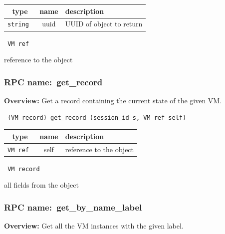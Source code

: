  
\vspace{0.3cm}
\begin{tabular}{|c|c|p{7cm}|}
 \hline
{\bf type} & {\bf name} & {\bf description} \\ \hline
{\tt string } & uuid & UUID of object to return \\ \hline 

\end{tabular}

\vspace{0.3cm}

{\tt 
VM ref
}


reference to the object
\vspace{0.3cm}
\vspace{0.3cm}
\vspace{0.3cm}
\subsubsection{RPC name:~get\_record}

{\bf Overview:} 
Get a record containing the current state of the given VM.

\begin{verbatim} (VM record) get_record (session_id s, VM ref self)\end{verbatim}



 
\vspace{0.3cm}
\begin{tabular}{|c|c|p{7cm}|}
 \hline
{\bf type} & {\bf name} & {\bf description} \\ \hline
{\tt VM ref } & self & reference to the object \\ \hline 

\end{tabular}

\vspace{0.3cm}

{\tt 
VM record
}


all fields from the object
\vspace{0.3cm}
\vspace{0.3cm}
\vspace{0.3cm}
\subsubsection{RPC name:~get\_by\_name\_label}

{\bf Overview:} 
Get all the VM instances with the given label.

